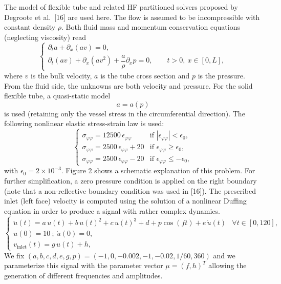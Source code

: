 \documentclass[11pt]{article}
\begin{document}
The model of flexible tube and related HF partitioned solvers proposed by Degroote et al.\ [16] are used here. The flow is assumed to be incompressible with constant density $\rho$. Both fluid mass and momentum conservation equations (neglecting viscosity) read
\begin{equation}
\tag{23}
\begin{cases}
\partial_t a + \partial_x (a v) = 0,\\[0.5em]
\partial_t (a v) + \partial_x (a v^2) + \dfrac{a}{\rho}\partial_x p = 0,
\qquad t > 0,\ x \in [0,L],
\end{cases}
\end{equation}
where $v$ is the bulk velocity, $a$ is the tube cross section and $p$ is the pressure. From the fluid side, the unknowns are both velocity and pressure. For the solid flexible tube, a quasi-static model
\[
a = a(p)
\]
is used (retaining only the vessel stress in the circumferential direction). The following nonlinear elastic stress-strain law is used:
\begin{equation}
\tag{24}
\begin{cases}
\sigma_{\varphi\varphi} = 12500\,\epsilon_{\varphi\varphi} & \text{if } |\epsilon_{\varphi\varphi}| < \epsilon_0,\\[0.5em]
\sigma_{\varphi\varphi} = 2500\,\epsilon_{\varphi\varphi} + 20 & \text{if } \epsilon_{\varphi\varphi} \ge \epsilon_0,\\[0.5em]
\sigma_{\varphi\varphi} = 2500\,\epsilon_{\varphi\varphi} - 20 & \text{if } \epsilon_{\varphi\varphi} \le -\epsilon_0,
\end{cases}
\end{equation}
with $\epsilon_0 = 2 \times 10^{-3}$. Figure 2 shows a schematic explanation of this problem. For further simplification, a zero pressure condition is applied on the right boundary (note that a non-reflective boundary condition was used in [16]). The prescribed inlet (left face) velocity is computed using the solution of a nonlinear Duffing equation in order to produce a signal with rather complex dynamics.
\begin{equation}
\tag{25}
\begin{cases}
\ddot{u}(t) = a\,u(t) + b\,u(t)^2 + c\,u(t)^3 + d + p\cos(f t) + e\,\dot{u}(t)
& \forall t \in [0,120],\\[0.5em]
u(0) = 10 \ ; \ \dot{u}(0) = 0,\\[0.5em]
v_{\mathrm{inlet}}(t) = g\,u(t) + h,
\end{cases}
\end{equation}
We fix $(a,b,c,d,e,g,p) = (-1,0,-0.002,-1,-0.02,1/60,360)$ and we parameterize this signal with the parameter vector $\mu = (f,h)^T$ allowing the generation of different frequencies and amplitudes.
\end{document}
